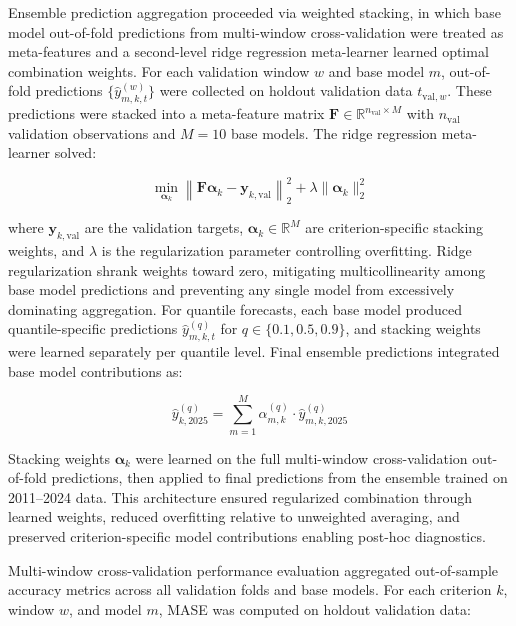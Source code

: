 \documentclass[12pt,a4paper]{article}
\begin{document}
Ensemble prediction aggregation proceeded via weighted stacking, in which base model out-of-fold predictions from multi-window cross-validation were treated as meta-features and a second-level ridge regression meta-learner learned optimal combination weights. For each validation window $w$ and base model $m$, out-of-fold predictions $\{\hat{y}_{m,k,t}^{(w)}\}$ were collected on holdout validation data $t_{\text{val},w}$. These predictions were stacked into a meta-feature matrix $\mathbf{F} \in \mathbb{R}^{n_{\text{val}} \times M}$ with $n_{\text{val}}$ validation observations and $M=10$ base models. The ridge regression meta-learner solved:

\begin{equation}
\label{eq:ridge_stacking}
\min_{\boldsymbol{\alpha}_k} \left\| \mathbf{F} \boldsymbol{\alpha}_k - \mathbf{y}_{k,\text{val}} \right\|_2^2 + \lambda \| \boldsymbol{\alpha}_k \|_2^2
\end{equation}

where $\mathbf{y}_{k,\text{val}}$ are the validation targets, $\boldsymbol{\alpha}_k \in \mathbb{R}^M$ are criterion-specific stacking weights, and $\lambda$ is the regularization parameter controlling overfitting. Ridge regularization shrank weights toward zero, mitigating multicollinearity among base model predictions and preventing any single model from excessively dominating aggregation. For quantile forecasts, each base model produced quantile-specific predictions $\hat{y}_{m,k,t}^{(q)}$ for $q \in \{0.1, 0.5, 0.9\}$, and stacking weights were learned separately per quantile level. Final ensemble predictions integrated base model contributions as:

\begin{equation}
\label{eq:ensemble_final}
\hat{y}_{k,2025}^{(q)} = \sum_{m=1}^{M} \alpha_{m,k}^{(q)} \cdot \hat{y}_{m,k,2025}^{(q)}
\end{equation}

Stacking weights $\boldsymbol{\alpha}_k$ were learned on the full multi-window cross-validation out-of-fold predictions, then applied to final predictions from the ensemble trained on 2011--2024 data. This architecture ensured regularized combination through learned weights, reduced overfitting relative to unweighted averaging, and preserved criterion-specific model contributions enabling post-hoc diagnostics.

Multi-window cross-validation performance evaluation aggregated out-of-sample accuracy metrics across all validation folds and base models. For each criterion $k$, window $w$, and model $m$, MASE was computed on holdout validation data:
\end{document}
